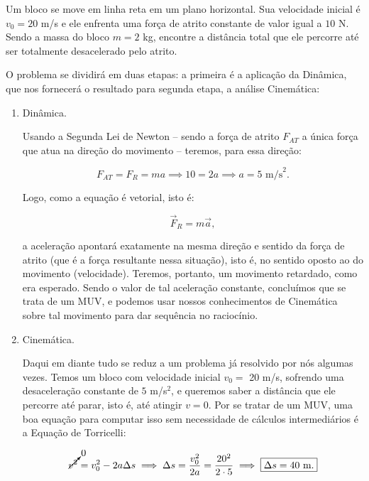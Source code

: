 \begin{exemplo}[Nível II]\label{exemplo_dinamica1_eq_dinamica1_segundaleinewtonex02}

Um bloco se move em linha reta em um plano horizontal. Sua velocidade inicial é $v_0=20$ m/s e ele enfrenta uma força de atrito constante de valor igual a $10$ N. Sendo a massa do bloco $m=2$ kg, encontre a distância total que ele percorre até ser totalmente desacelerado pelo atrito.

\resolucao

O problema se dividirá em duas etapas: a primeira é a aplicação da Dinâmica, que nos fornecerá o resultado para segunda etapa, a análise Cinemática:

\begin{enumerate}
    \item [(i)] Dinâmica.

    Usando a Segunda Lei de Newton -- sendo a força de atrito $F_{AT}$ a única força que atua na direção do movimento -- teremos, para essa direção:

    $$ F_{AT}  = F_R = ma \implies 10 = 2 a \implies \boxed{a = 5 \text{ m/s}^2.}  $$

    Logo, como a equação é vetorial, isto é:

    $$ \vec F_{R} = m \vec a,$$

    \noindent a aceleração apontará exatamente na mesma direção e sentido da força de atrito (que é a força resultante nessa situação), isto é, no sentido oposto ao do movimento (velocidade). Teremos, portanto, um movimento retardado, como era esperado. Sendo o valor de tal aceleração constante, concluímos que se trata de um MUV, e podemos usar nossos conhecimentos de Cinemática sobre tal movimento para dar sequência no raciocínio.

    \item [(ii)] Cinemática.

    Daqui em diante tudo se reduz a um problema já resolvido por nós algumas vezes. Temos um bloco com velocidade inicial $v_0=$ 20 m/s, sofrendo uma desaceleração constante de $5$ m/s$^2$, e queremos saber a distância que ele percorre até parar, isto é, até atingir $v=0.$ Por se tratar de um MUV, uma boa equação para computar isso sem necessidade de cálculos intermediários é a Equação de Torricelli:

    $$ \cancelto{0}{v^2} = v_0^2 -2a \Delta s \implies \Delta s = \dfrac{v_0^2}{2a} = \dfrac{20^2}{2 \cdot 5} \implies \boxed{\Delta s = 40 \text{ m} .}$$
\end{enumerate}


\end{exemplo}
